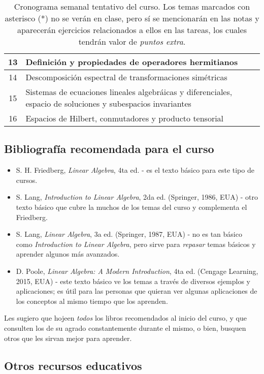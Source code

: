 \documentclass[12pt]{article}
\begin{document}
\begin{table}[ht]
\begin{tabularx}{\linewidth}{|c|X|}
    \hline 13 & Definición y propiedades de operadores hermitianos \\
    \hline 14 & Descomposición espectral de transformaciones simétricas \\
    \hline 15 & Sistemas de ecuaciones lineales algebráicas y diferenciales, espacio de soluciones y subespacios invariantes \\
    \hline 16 & Espacios de Hilbert, conmutadores y producto tensorial  \\
    \hline
    \end{tabularx}
    \caption{Cronograma semanal tentativo del curso. Los temas marcados con asterisco (*) no se verán en clase, pero sí se mencionarán en las notas y aparecerán ejercicios relacionados a ellos en las tareas, los cuales tendrán valor de \emph{puntos extra}.}
    \label{Cronograma}
\end{table}{}

\subsection{Bibliografía recomendada para el curso} \label{Bibliografía}

\begin{itemize}
    \item S. H. Friedberg, \emph{Linear Algebra}, 4ta ed. - es el texto básico para este tipo de cursos.
    \item S. Lang, \emph{Introduction to Linear Algebra}, 2da ed. (Springer, 1986, EUA) - otro texto básico que cubre la muchos de los temas del curso y complementa el Friedberg.
    \item S. Lang, \emph{Linear Algebra}, 3a ed. (Springer, 1987, EUA) - no es tan básico como \emph{Introduction to Linear Algebra}, pero sirve para \emph{repasar} temas básicos y aprender algunos más avanzados.
    \item D. Poole, \emph{Linear Algebra: A Modern Introduction}, 4ta ed. (Cengage Learning, 2015, EUA) - este texto básico ve los temas a través de diversos ejemplos y aplicaciones; es útil para las personas que quieran ver algunas aplicaciones de los conceptos al mismo tiempo que los aprenden.
\end{itemize}{}

Les sugiero que hojeen \emph{todos} los libros recomendados al inicio del curso, y que consulten los de su agrado constantemente durante el mismo, o bien, busquen otros que les sirvan mejor para aprender.

\subsection{Otros recursos educativos}
\end{document}
